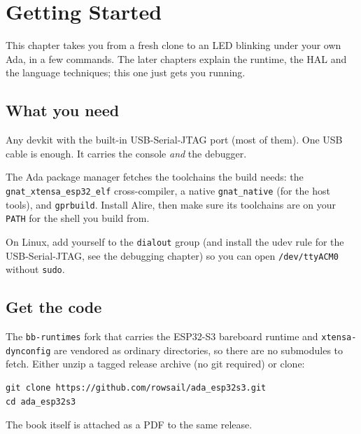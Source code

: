 \chapter{Getting Started}
\label{ch:getting-started}

This chapter takes you from a fresh clone to an LED blinking under your own Ada,
in a few commands. The later chapters explain the runtime, the HAL and the
language techniques; this one just gets you running.

\section{What you need}

\begin{description}[style=nextline]
\item[An ESP32-S3 board.] Any devkit with the built-in USB-Serial-JTAG port (most
  of them). One USB cable is enough. It carries the console \emph{and} the
  debugger.
\item[Alire (\texttt{alr}).] The Ada package manager fetches the toolchains the
  build needs: the \texttt{gnat\_xtensa\_esp32\_elf} cross-compiler, a native
  \texttt{gnat\_native} (for the host tools), and \texttt{gprbuild}. Install Alire,
  then make sure its toolchains are on your \texttt{PATH} for the shell you build
  from.
\item[Serial-port permission.] On Linux, add yourself to the \texttt{dialout}
  group (and install the udev rule for the USB-Serial-JTAG, see the debugging
  chapter) so you can open \texttt{/dev/ttyACM0} without \texttt{sudo}.
\end{description}

\section{Get the code}

The \texttt{bb-runtimes} fork that carries the ESP32-S3 bareboard runtime and
\texttt{xtensa-dynconfig} are vendored as ordinary directories, so there are no
submodules to fetch. Either unzip a tagged release archive (no git required) or
clone:

\begin{lstlisting}[style=sh]
git clone https://github.com/rowsail/ada_esp32s3.git
cd ada_esp32s3
\end{lstlisting}

\noindent The book itself is attached as a PDF to the same release.

